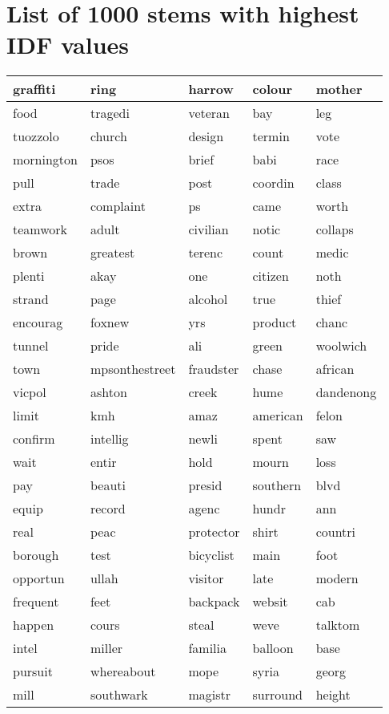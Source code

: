 \chapter{List of 1000 stems with highest IDF values}\label{1000_stems}

\begin{longtable}{p{2.5cm}p{2.5cm}p{2.5cm}p{2.5cm}p{2.5cm}}
graffiti&ring&harrow&colour&mother\\ \hline 
food&tragedi&veteran&bay&leg\\ \hline 
tuozzolo&church&design&termin&vote\\ \hline 
mornington&psos&brief&babi&race\\ \hline 
pull&trade&post&coordin&class\\ \hline 
extra&complaint&ps&came&worth\\ \hline 
teamwork&adult&civilian&notic&collaps\\ \hline 
brown&greatest&terenc&count&medic\\ \hline 
plenti&akay&one&citizen&noth\\ \hline 
strand&page&alcohol&true&thief\\ \hline 
encourag&foxnew&yrs&product&chanc\\ \hline 
tunnel&pride&ali&green&woolwich\\ \hline 
town&mpsonthestreet&fraudster&chase&african\\ \hline 
vicpol&ashton&creek&hume&dandenong\\ \hline 
limit&kmh&amaz&american&felon\\ \hline 
confirm&intellig&newli&spent&saw\\ \hline 
wait&entir&hold&mourn&loss\\ \hline 
pay&beauti&presid&southern&blvd\\ \hline 
equip&record&agenc&hundr&ann\\ \hline 
real&peac&protector&shirt&countri\\ \hline 
borough&test&bicyclist&main&foot\\ \hline 
opportun&ullah&visitor&late&modern\\ \hline 
frequent&feet&backpack&websit&cab\\ \hline 
happen&cours&steal&weve&talktom\\ \hline 
intel&miller&familia&balloon&base\\ \hline 
pursuit&whereabout&mope&syria&georg\\ \hline 
mill&southwark&magistr&surround&height\\ \hline 

\end{longtable}
